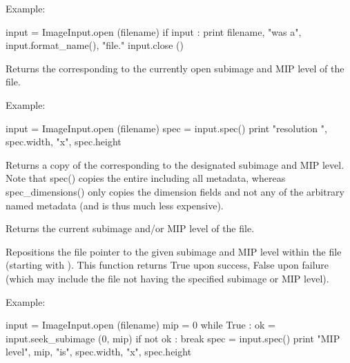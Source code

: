 \noindent Example:
\begin{code}
    input = ImageInput.open (filename)
    if input :
        print filename, "was a", input.format_name(), "file."
        input.close ()
  
\end{code}
\apiend

Returns the \ImageSpec corresponding to the currently open subimage and
MIP level of the file.

\noindent Example:
\begin{code}
    input = ImageInput.open (filename)
    spec = input.spec()
    print "resolution ", spec.width, "x", spec.height
\end{code}
\apiend

\NEW %
Returns a copy of the \ImageSpec corresponding to the designated subimage
and MIP level. Note that {\cf spec()} copies the entire \ImageSpec including
all metadata, whereas {\cf spec_dimensions()} only copies the dimension
fields and not any of the arbitrary named metadata (and is thus much less
expensive).
\apiend

Returns the current subimage and/or MIP level of the file.
\apiend

Repositions the file pointer to the given subimage and MIP level within the
file (starting with {}).  This function returns {\cf True} upon success,
{\cf False} upon failure (which may include the file not having the
specified subimage or MIP level).

\noindent Example:
\begin{code}
    input = ImageInput.open (filename)
    mip = 0
    while True :
        ok = input.seek_subimage (0, mip)
        if not ok :
            break
        spec = input.spec()
        print "MIP level", mip, "is", spec.width, "x", spec.height
\end{code}
\apiend


